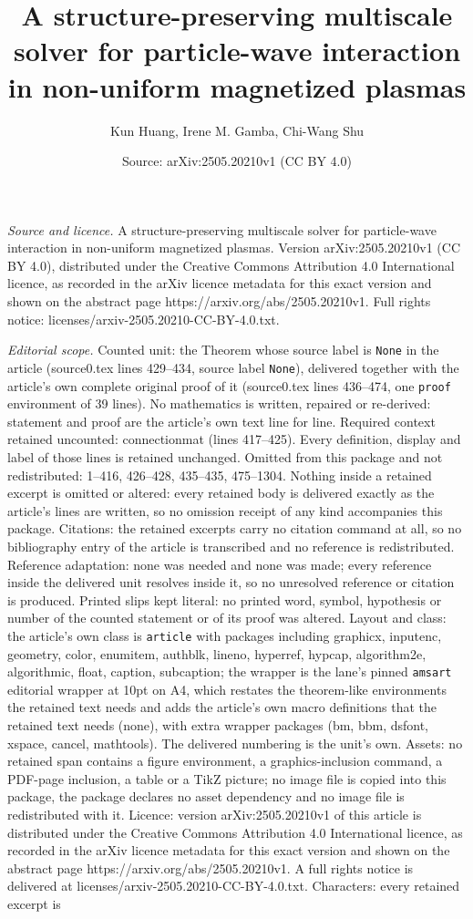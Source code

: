 \documentclass[10pt,a4paper]{amsart}
\title[A structure-preserving multiscale solver for particle-wave i]{A structure-preserving multiscale solver for particle-wave interaction in non-uniform magnetized plasmas}
\author{Kun Huang, Irene M. Gamba, Chi-Wang Shu}
\date{Source: arXiv:2505.20210v1 (CC BY 4.0)}
\begin{document}
\maketitle

\noindent\emph{Source and licence.} A structure-preserving multiscale solver for particle-wave interaction in non-uniform magnetized plasmas. Version arXiv:2505.20210v1 (CC BY 4.0), distributed under the Creative Commons Attribution 4.0 International licence, as recorded in the arXiv licence metadata for this exact version and shown on the abstract page https://arxiv.org/abs/2505.20210v1. Full rights notice: licenses/arxiv-2505.20210-CC-BY-4.0.txt.\par\smallskip

\noindent\textit{Editorial scope.} Counted unit: the Theorem whose source label is \texttt{None} in the article (source0.tex lines 429--434, source label \texttt{None}), delivered together with the article's own complete original proof of it (source0.tex lines 436--474, one \texttt{proof} environment of 39 lines). No mathematics is written, repaired or re-derived: statement and proof are the article's own text line for line. Required context retained uncounted: connectionmat (lines 417--425). Every definition, display and label of those lines is retained unchanged. Omitted from this package and not redistributed: 1--416, 426--428, 435--435, 475--1304. Nothing inside a retained excerpt is omitted or altered: every retained body is delivered exactly as the article's lines are written, so no omission receipt of any kind accompanies this package. Citations: the retained excerpts carry no citation command at all, so no bibliography entry of the article is transcribed and no reference is redistributed. Reference adaptation: none was needed and none was made; every reference inside the delivered unit resolves inside it, so no unresolved reference or citation is produced. Printed slips kept literal: no printed word, symbol, hypothesis or number of the counted statement or of its proof was altered. Layout and class: the article's own class is \texttt{article} with packages including graphicx, inputenc, geometry, color, enumitem, authblk, lineno, hyperref, hypcap, algorithm2e, algorithmic, float, caption, subcaption; the wrapper is the lane's pinned \texttt{amsart} editorial wrapper at 10pt on A4, which restates the theorem-like environments the retained text needs and adds the article's own macro definitions that the retained text needs (none), with extra wrapper packages (bm, bbm, dsfont, xspace, cancel, mathtools). The delivered numbering is the unit's own. Assets: no retained span contains a figure environment, a graphics-inclusion command, a PDF-page inclusion, a table or a TikZ picture; no image file is copied into this package, the package declares no asset dependency and no image file is redistributed with it. Licence: version arXiv:2505.20210v1 of this article is distributed under the Creative Commons Attribution 4.0 International licence, as recorded in the arXiv licence metadata for this exact version and shown on the abstract page https://arxiv.org/abs/2505.20210v1. A full rights notice is delivered at licenses/arxiv-2505.20210-CC-BY-4.0.txt. Characters: every retained excerpt is 
\end{document}
